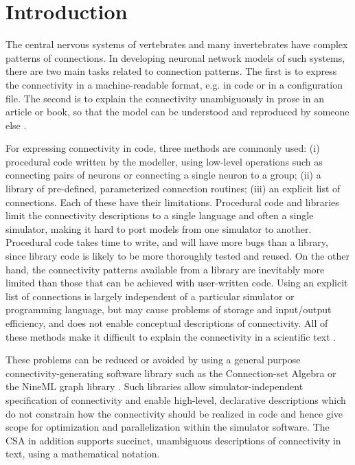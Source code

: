 \documentclass{frontiersSCNS} %
\begin{document}
\section{Introduction}

The central nervous systems of vertebrates and many invertebrates have
complex patterns of connections.  In developing neuronal network
models of such systems, there are two main tasks related to connection
patterns.  The first is to express the connectivity in a
machine-readable format, e.g. in code or in a configuration file.  The
second is to explain the connectivity unambiguously in prose in an
article or book, so that the model can be understood and reproduced by
someone else \citep{nordlie-2009_e1000456}.

For expressing connectivity in code, three methods are commonly used:
(i) procedural code written by the modeller, using low-level
operations such as connecting pairs of neurons or connecting a single
neuron to a group; (ii) a library of pre-defined, parameterized
connection routines; (iii) an explicit list of connections.  Each of
these have their limitations.  Procedural code and libraries limit the
connectivity descriptions to a single language and often a single
simulator, making it hard to port models from one simulator to
another.  Procedural code takes time to write, and will have more bugs
than a library, since library code is likely to be more thoroughly
tested and reused.  On the other hand, the connectivity patterns
available from a library are inevitably more limited than those that
can be achieved with user-written code.  Using an explicit list of
connections is largely independent of a particular simulator or
programming language, but may cause problems of storage and
input/output efficiency, and does not enable conceptual descriptions
of connectivity.  All of these methods make it difficult to explain
the connectivity in a scientific text \citep{crook12}.

These problems can be reduced or avoided by using a general purpose
connectivity-generating software library such as the Connection-set
Algebra \citep[CSA;][]{djurfeldt12} or the NineML graph library
\citep{raikov10}.  Such libraries allow simulator-independent
specification of connectivity and enable high-level, declarative
descriptions which do not constrain how the connectivity should be
realized in code and hence give scope for optimization and
parallelization within the simulator software.  The CSA in addition
supports succinct, unambiguous descriptions of connectivity in text,
using a mathematical notation.
\end{document}
